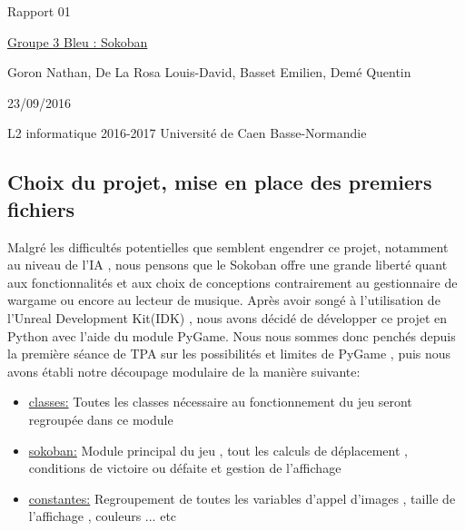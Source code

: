 \documentclass{article}
\begin{document}
\begin{titlepage}
\begin{center}
\Huge Rapport 01

\normalsize
\vspace{0.5cm}
\Large {\underline{ Groupe 3 Bleu : Sokoban} }

\vspace{1cm}
\normalsize
Goron Nathan, De La Rosa Louis-David, Basset Emilien, Demé Quentin
\newline
\newline

23/09/2016

\vspace{14cm}
L2 informatique 2016-2017 Université de Caen Basse-Normandie
\end{center}
\end{titlepage}


\newpage
\begin{center}
\section{Choix du projet, mise en place des premiers fichiers }
\end{center}
Malgré les difficultés potentielles que semblent engendrer ce projet, notamment au niveau de l'IA , nous pensons que le Sokoban offre une grande liberté quant aux fonctionnalités et aux choix de conceptions contrairement au gestionnaire de wargame ou encore au lecteur de musique.\newline
Après avoir songé à l'utilisation de l'Unreal Development Kit(IDK) , nous avons décidé de développer ce projet en Python avec l'aide du module PyGame.\newline
Nous nous sommes donc penchés depuis la première séance de TPA sur les possibilités et limites de PyGame , puis nous avons établi notre découpage modulaire de la manière suivante:
\vspace{0.3cm}
\begin{itemize}

\item \underline{classes:}
Toutes les classes nécessaire au fonctionnement du jeu seront regroupée dans ce module
\item \underline{sokoban:}
Module principal du jeu , tout les calculs de déplacement , conditions de victoire ou défaite et gestion de l'affichage 
\item \underline{constantes:}
Regroupement de toutes les variables d'appel d'images , taille de l'affichage , couleurs ... etc
\end{itemize}
\end{document}
